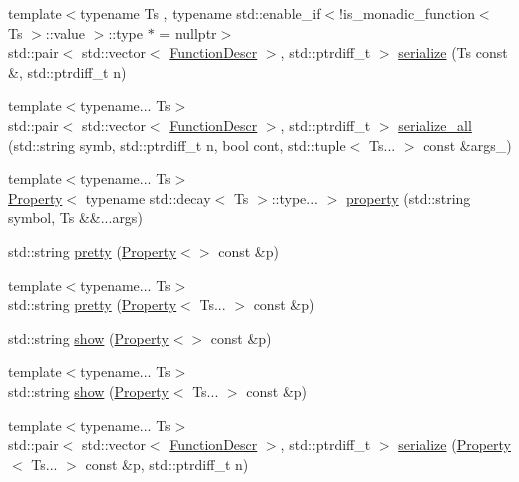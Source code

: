 \begin{DoxyCompactItemize}
\item 
{\footnotesize template$<$typename Ts , typename std\+::enable\+\_\+if$<$!is\+\_\+monadic\+\_\+function$<$ Ts $>$\+::value $>$\+::type $\ast$  = nullptr$>$ }\\std\+::pair$<$ std\+::vector$<$ \hyperlink{structpfq_1_1lang_1_1FunctionDescr}{Function\+Descr} $>$, std\+::ptrdiff\+\_\+t $>$ \hyperlink{namespacepfq_1_1lang_ae121f9fc8e23fbd6873d45d02e9adb81}{serialize} (Ts const \&, std\+::ptrdiff\+\_\+t n)
\item 
{\footnotesize template$<$typename... Ts$>$ }\\std\+::pair$<$ std\+::vector$<$ \hyperlink{structpfq_1_1lang_1_1FunctionDescr}{Function\+Descr} $>$, std\+::ptrdiff\+\_\+t $>$ \hyperlink{namespacepfq_1_1lang_acd7f9c34960d4f3511228a5568628acf}{serialize\+\_\+all} (std\+::string symb, std\+::ptrdiff\+\_\+t n, bool cont, std\+::tuple$<$ Ts... $>$ const \&args\+\_\+)
\item 
{\footnotesize template$<$typename... Ts$>$ }\\\hyperlink{structpfq_1_1lang_1_1Property}{Property}$<$ typename std\+::decay$<$ Ts $>$\+::type... $>$ \hyperlink{namespacepfq_1_1lang_a1249450e72229273b0db707a286aea91}{property} (std\+::string symbol, Ts \&\&...args)
\item 
std\+::string \hyperlink{namespacepfq_1_1lang_ac2521931d090c58e1edaf556692f66d2}{pretty} (\hyperlink{structpfq_1_1lang_1_1Property}{Property}$<$$>$ const \&p)
\item 
{\footnotesize template$<$typename... Ts$>$ }\\std\+::string \hyperlink{namespacepfq_1_1lang_ad72cdee2fca49246a75620232dfe061a}{pretty} (\hyperlink{structpfq_1_1lang_1_1Property}{Property}$<$ Ts... $>$ const \&p)
\item 
std\+::string \hyperlink{namespacepfq_1_1lang_ad0e3d7a27621b981fa381f110ba59db7}{show} (\hyperlink{structpfq_1_1lang_1_1Property}{Property}$<$$>$ const \&p)
\item 
{\footnotesize template$<$typename... Ts$>$ }\\std\+::string \hyperlink{namespacepfq_1_1lang_a94bf1496c888adfd3d99e25895ed6df8}{show} (\hyperlink{structpfq_1_1lang_1_1Property}{Property}$<$ Ts... $>$ const \&p)
\item 
{\footnotesize template$<$typename... Ts$>$ }\\std\+::pair$<$ std\+::vector$<$ \hyperlink{structpfq_1_1lang_1_1FunctionDescr}{Function\+Descr} $>$, std\+::ptrdiff\+\_\+t $>$ \hyperlink{namespacepfq_1_1lang_ac9dfedf649f03709f23fc7ca4afc1679}{serialize} (\hyperlink{structpfq_1_1lang_1_1Property}{Property}$<$ Ts... $>$ const \&p, std\+::ptrdiff\+\_\+t n)

\end{DoxyCompactItemize}
